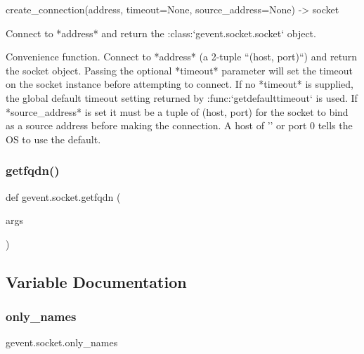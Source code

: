 \begin{DoxyVerb}create_connection(address, timeout=None, source_address=None) -> socket

Connect to *address* and return the :class:`gevent.socket.socket`
object.

Convenience function. Connect to *address* (a 2-tuple ``(host,
port)``) and return the socket object. Passing the optional
*timeout* parameter will set the timeout on the socket instance
before attempting to connect. If no *timeout* is supplied, the
global default timeout setting returned by
:func:`getdefaulttimeout` is used. If *source_address* is set it
must be a tuple of (host, port) for the socket to bind as a source
address before making the connection. A host of '' or port 0 tells
the OS to use the default.
\end{DoxyVerb}
 \mbox{\label{namespacegevent_1_1socket_ae9e275f44ef03a2a34bf7d2e339b7fa5}} 
\subsubsection{\texorpdfstring{getfqdn()}{getfqdn()}}
{\footnotesize\ttfamily def gevent.\+socket.\+getfqdn (\begin{DoxyParamCaption}\item[{}]{args }\end{DoxyParamCaption})}



\subsection{Variable Documentation}
\mbox{\label{namespacegevent_1_1socket_adf1c14efa060acbfd56cde8ad6ff2f51}} 
\subsubsection{\texorpdfstring{only\+\_\+names}{only\_names}}
{\footnotesize\ttfamily gevent.\+socket.\+only\+\_\+names}

